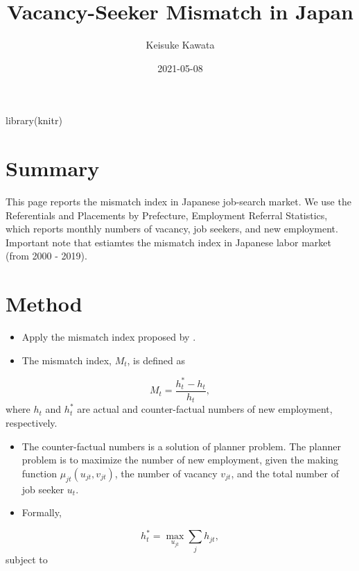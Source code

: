\documentclass[
]{book}
\title{Vacancy-Seeker Mismatch in Japan}
\author{Keisuke Kawata}
\date{2021-05-08}
\newenvironment{Shaded}{\begin{snugshade}}{\end{snugshade}}
\newcommand{\FunctionTok}[1]{\textcolor[rgb]{0.00,0.00,0.00}{#1}}
\newcommand{\NormalTok}[1]{#1}
\begin{document}
\maketitle

{
\setcounter{tocdepth}{1}
\tableofcontents
}
\begin{Shaded}
\begin{Highlighting}[]
\FunctionTok{library}\NormalTok{(knitr)}
\end{Highlighting}
\end{Shaded}

\hypertarget{summary}{%
\chapter{Summary}\label{summary}}

This page reports the mismatch index \citep{csahin2014mismatch} in Japanese job-search market.
We use the Referentials and Placements by Prefecture, Employment Referral Statistics, which reports monthly numbers of vacancy, job seekers, and new employment.
Important note that \citet{ippei2020labor} estiamtes the mismatch index in Japanese labor market (from 2000 - 2019).

\hypertarget{intro}{%
\chapter{Method}\label{intro}}

\begin{itemize}
\item
  Apply the mismatch index proposed by \citet{csahin2014mismatch}.
\item
  The mismatch index, \(M_t\), is defined as
\end{itemize}

\[M_t = \frac{h_t^{*}-h_t}{h_t},\]
where \(h_t\) and \(h_t^*\) are actual and counter-factual numbers of new employment, respectively.

\begin{itemize}
\item
  The counter-factual numbers is a solution of planner problem.
  The planner problem is to maximize the number of new employment, given the making function \(\mu_{jt}(u_{jt},v_{jt})\), the number of vacancy \(v_{jt}\), and the total number of job seeker \(u_{t}\).
\item
  Formally,
\end{itemize}

\[h_t^*=\max_{u_{jt}} \sum_j h_{jt},\]
subject to
\end{document}

